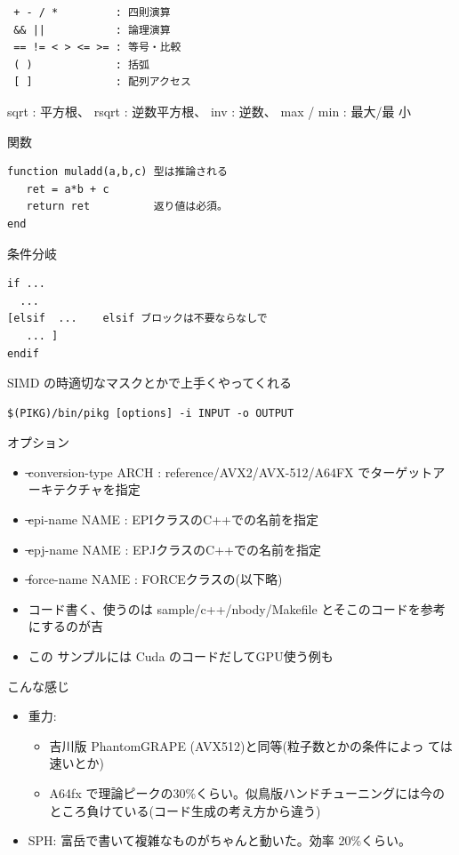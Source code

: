 \documentclass[12pt,dvipdfmx]{article}
\begin{document}

\begin{verbatim}
 + - / *         : 四則演算
 && ||           : 論理演算
 == != < > <= >= : 等号・比較
 ( )             : 括弧
 [ ]             : 配列アクセス
\end{verbatim}

sqrt : 平方根、 rsqrt : 逆数平方根、 inv : 逆数、 max / min : 最大/最
小

関数
\begin{verbatim}
function muladd(a,b,c) 型は推論される
   ret = a*b + c       
   return ret          返り値は必須。
end   
\end{verbatim}

条件分岐
\begin{verbatim}
if ...
  ...
[elsif  ...    elsif ブロックは不要ならなしで
   ... ]
endif   
\end{verbatim}
SIMD の時適切なマスクとかで上手くやってくれる


\begin{verbatim}
$(PIKG)/bin/pikg [options] -i INPUT -o OUTPUT
\end{verbatim}

オプション
\begin{itemize}
\item ̶conversion-type ARCH : reference/AVX2/AVX-512/A64FX でターゲットアーキテクチャを指定
\item ̶epi-name NAME : EPIクラスのC++での名前を指定
\item ̶epj-name NAME : EPJクラスのC++での名前を指定
\item ̶force-name NAME : FORCEクラスの(以下略)
\end{itemize}

\begin{shadebox}
\begin{itemize}
\item コード書く、使うのは sample/c++/nbody/Makefile とそこのコードを参考にするのが吉
\item この サンプルには Cuda のコードだしてGPU使う例も
\end{itemize}
\end{shadebox}

こんな感じ

\begin{itemize}

\item 重力:
\begin{itemize}
\item 吉川版 PhantomGRAPE (AVX512)と同等(粒子数とかの条件によっ
ては速いとか)
\item  A64fx で理論ピークの30\%くらい。似鳥版ハンドチューニングには今のところ負けている(コード生成の考え方から違う)
\end{itemize}
\item SPH: 富岳で書いて複雑なものがちゃんと動いた。効率 20\%くらい。

\end{itemize}
\end{document}
